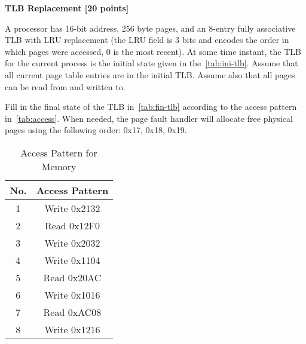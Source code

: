 \documentclass[addpoints, 12pt, answers]{exam}
\begin{document}
\begin{questions}


\pagebreak

\question[20] \textbf{TLB Replacement [20 points]}

A processor has 16-bit address, 256 byte pages, 
and an 8-entry fully associative TLB with LRU replacement 
(the LRU field is 3 bits and encodes the order in which pages were accessed, 
0 is the most recent). 
At some time instant, 
the TLB for the current process is the initial state given in the~\autoref{tab:ini-tlb}. 
Assume that all current page table entries are in the initial TLB. 
Assume also that all pages can be read from and written to. 

Fill in the final state of the TLB in~\autoref{tab:fin-tlb} according to the access pattern in~\autoref{tab:access}. 
When needed, the page fault handler will allocate free physical pages using the following order: 0x17, 0x18, 0x19.


\begin{table}[H]
	\centering
	\caption{Access Pattern for Memory}
	\label{tab:access}
	\begin{tabular}{|c|c|}
	\hline
	No. & Access Pattern \\ \hline
	1   & Write 0x2132   \\ \hline
	2   & Read  0x12F0    \\ \hline
	3   & Write 0x2032   \\ \hline
	4   & Write 0x1104   \\ \hline
	5   & Read  0x20AC    \\ \hline
	6   & Write 0x1016    \\ \hline
    7   & Read  0xAC08    \\ \hline
    8   & Write 0x1216    \\ \hline
	\end{tabular}
\end{table}



\end{questions}
\end{document}
